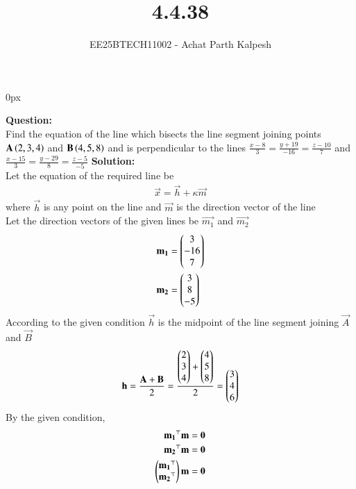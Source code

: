 \documentclass[journal]{IEEEtran}
\begin{document}

\title{4.4.38}
\author{EE25BTECH11002 - Achat Parth Kalpesh }
{\let\newpage\relax\maketitle}
\renewcommand{\thefigure}{\theenumi}
\renewcommand{\thetable}{\theenumi}
\setlength{\intextsep}{10pt} %
\renewcommand{\thetable}{\theenumi}
\parindent 0px


\textbf{Question:}\\
Find the equation of the line which bisects the line segment joining points $\mathbf{A}\left(2,3,4\right)$ and $\mathbf{B}\left(4,5,8\right)$ and is perpendicular to the lines $\frac{x-8}{3} = \frac{y+19}{-16} = \frac{z-10}{7}$ and $\frac{x-15}{3} = \frac{y-29}{8} = \frac{z-5}{-5}$
\textbf{Solution:}\\
Let the equation of the required line be 
\begin{align}
    \vec{x} = \vec{h} + \kappa \vec{m}
\end{align}
where $\vec{h}$ is any point on the line and
$\vec{m}$ is the direction vector of the line\\
Let the direction vectors of the given lines be $\vec{m_1}$ and  $\vec{m_2}$  
\begin{align}
    \mathbf{m_1} &= \begin{pmatrix}3\\-16\\7\end{pmatrix} \\
    \mathbf{m_2} &= \begin{pmatrix}3\\8\\-5\end{pmatrix}
\end{align}
According to the given condition $\vec{h}$ is the midpoint of the line segment joining  $\vec{A}$ and $\vec{B}$ 
\begin{align}
    \mathbf{h} = \frac{\mathbf{A} + \mathbf{B}}{2} = \frac{\begin{pmatrix}2 \\ 3 \\ 4\end{pmatrix} + \begin{pmatrix}4 \\ 5 \\ 8\end{pmatrix}}{2} = \begin{pmatrix}3 \\ 4 \\ 6\end{pmatrix}
\end{align}
By the given condition,
\begin{align}
    \mathbf{m_1}^\top\mathbf{m} &= \mathbf{0}\\
    \mathbf{m_2}^\top\mathbf{m} &= \mathbf{0}\\
    \begin{pmatrix}\mathbf{m_1}^\top \\ \mathbf{m_2}^\top\end{pmatrix} \mathbf{m} &= \mathbf{0}
\end{align}
\end{document}
